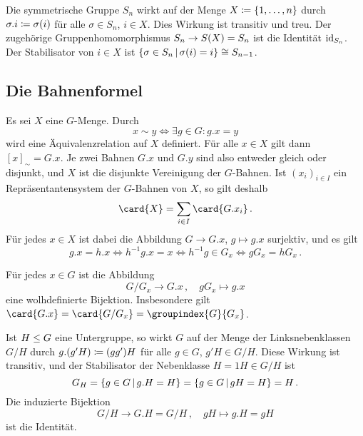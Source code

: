 \begin{example}
  Die symmetrische Gruppe $S_n$ wirkt auf der Menge $X \coloneqq \{1, \dotsc, n\}$ durch $\sigma.i \coloneqq \sigma(i)$ für alle $\sigma \in S_n$, $i \in X$.
  Dies Wirkung ist transitiv und treu.
  Der zugehörige Gruppenhomomorphismus $S_n \to S(X) = S_n$ ist die Identität $\operatorname{id}_{S_n}$.
  Der Stabilisator von $i \in X$ ist $\{ \sigma \in S_n \suchthat \sigma(i) = i \} \cong S_{n-1}$.
\end{example}



\subsection{Die Bahnenformel}

Es sei $X$ eine $G$-Menge.
Durch
\[
        x \sim y
  \iff  \exists g \in G: g.x = y
\]
wird eine Äquivalenzrelation auf $X$ definiert.
Für alle $x \in X$ gilt dann $[x]_{\sim} = G.x$.
Je zwei Bahnen $G.x$ und $G.y$ sind also entweder gleich oder disjunkt, und $X$ ist die disjunkte Vereinigung der $G$-Bahnen.
Ist $(x_i)_{i \in I}$ ein Repräsentantensystem der $G$-Bahnen von $X$, so gilt deshalb
\begin{equation}
\label{equation: orbit formula alpha}
    \card{X}
  = \sum_{i \in I} \card{G.x_i} \,.
\end{equation}
Für jedes $x \in X$ ist dabei die Abbildung $G \to G.x$, $g \mapsto g.x$ surjektiv, und es gilt
\[
        g.x = h.x
  \iff  h^{-1}g.x = x
  \iff  h^{-1} g \in G_x
  \iff  g G_x = h G_x \,.
\]

\begin{lemma}
  \label{lemma: classification of transitive G-sets}
  Für jedes $x \in G$ ist die Abbildung
  \[
            G/G_x
    \to     G.x \,,
    \quad   g G_x
    \mapsto g.x
  \]
  eine wolhdefinierte Bijektion.
  Insbesondere gilt $\card{G.x} = \card{G/G_x} = \groupindex{G}{G_x}$.
\end{lemma}

\begin{example}
  Ist $H \mathrel{\leq} G$ eine Untergruppe, so wirkt $G$ auf der Menge der Linksnebenklassen $G/H$ durch $g.(g'H) \coloneqq (gg')H$ für alle $g \in G$, $g'H \in G/H$.
  Diese Wirkung ist transitiv, und der Stabilisator der Nebenklasse $H = 1H \in G/H$ ist
  \[
      G_H
    = \{ g \in G \suchthat g.H = H \}
    = \{ g \in G \suchthat gH = H \}
    = H \,.
  \]
  Die induzierte Bijektion
  \[
            G/H
    \to     G.H
    =       G/H \,,
    \quad   gH
    \mapsto g.H
    =       gH
  \]
  ist die Identität.
\end{example}

